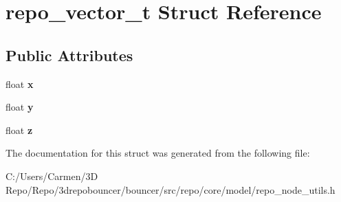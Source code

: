 \hypertarget{structrepo__vector__t}{}\section{repo\+\_\+vector\+\_\+t Struct Reference}
\label{structrepo__vector__t}
\subsection*{Public Attributes}
\begin{DoxyCompactItemize}
\item 
\hypertarget{structrepo__vector__t_aedc4d3bd4a28c15f8cff00d37cd9db98}{}float {\bfseries x}\label{structrepo__vector__t_aedc4d3bd4a28c15f8cff00d37cd9db98}

\item 
\hypertarget{structrepo__vector__t_a18d3391aa6f971cb125bbab9a4c6fc4c}{}float {\bfseries y}\label{structrepo__vector__t_a18d3391aa6f971cb125bbab9a4c6fc4c}

\item 
\hypertarget{structrepo__vector__t_a6bec151d27475aeaa3ead41e4c614779}{}float {\bfseries z}\label{structrepo__vector__t_a6bec151d27475aeaa3ead41e4c614779}

\end{DoxyCompactItemize}


The documentation for this struct was generated from the following file\+:\begin{DoxyCompactItemize}
\item 
C\+:/\+Users/\+Carmen/3\+D Repo/\+Repo/3drepobouncer/bouncer/src/repo/core/model/repo\+\_\+node\+\_\+utils.\+h\end{DoxyCompactItemize}
